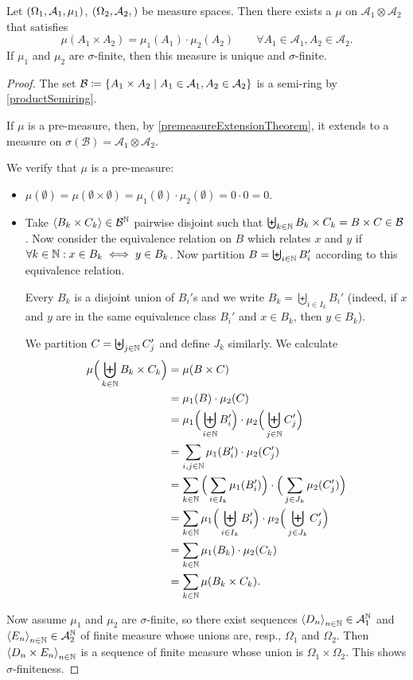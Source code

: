 \begin{proposition} \label{productMeasure}
Let $\sSet{\Omega_1, \mathcal{A}_1,\mu_1}$, $\sSet{\Omega_2, \mathcal{A}_2, }$ be measure spaces. Then there exists a $\mu$ on $\mathcal{A}_1\otimes\mathcal{A}_2$ that satisfies
\[ \mu(A_1\times A_2) = \mu_1(A_1)\cdot\mu_2(A_2) \qquad \forall A_1\in\mathcal{A}_1, A_2\in\mathcal{A}_2. \]
If $\mu_1$ and $\mu_2$ are $\sigma$-finite, then this measure is unique and $\sigma$-finite.
\end{proposition}
\begin{proof}
The set $\mathcal{B} \defeq \setbuilder{A_1\times A_2}{A_1\in \mathcal{A}_1, A_2\in \mathcal{A}_2}$ is a semi-ring by \ref{productSemiring}. 

If $\mu$ is a pre-measure, then, by \ref{premeasureExtensionTheorem}, it extends to a measure on $\sigma(\mathcal{B}) = \mathcal{A}_1\otimes\mathcal{A}_2$.

We verify that $\mu$ is a pre-measure:
\begin{itemize}
\item $\mu(\emptyset) = \mu(\emptyset \times\emptyset) = \mu_1(\emptyset)\cdot \mu_2(\emptyset) = 0\cdot 0 = 0$.
\item Take $\left\langle B_k\times C_k \right\rangle \in \mathcal{B}^{\mathbb{N}}$ pairwise disjoint such that $\biguplus_{k\in\mathbb{N}}B_k\times C_k = B\times C\in \mathcal{B}$. Now consider the equivalence relation on $B$ which relates $x$ and $y$ if $\forall k\in\mathbb{N}: x\in B_k \iff y\in B_k$. Now partition $B = \biguplus_{i\in\mathbb{N}} B'_{i}$ according to this equivalence relation. 

Every $B_k$ is a disjoint union of $B_i'$s and we write $B_k = \biguplus_{i\in I_k}B_i'$ (indeed, if $x$ and $y$ are in the same equivalence class $B_i'$ and $x\in B_k$, then $y\in B_k$). 

We partition $C = \biguplus_{j\in\mathbb{N}}C'_j$ and define $J_k$ similarly. We calculate
\begin{align*}
\mu\Big(\biguplus_{k\in\mathbb{N}} B_k\times C_k \Big) &= \mu(B\times C) \\
&= \mu_1(B)\cdot\mu_2(C) \\
&= \mu_1\Big(\biguplus_{i\in\mathbb{N}}B'_{i}\Big)\cdot\mu_2\Big(\biguplus_{j\in\mathbb{N}}C'_{j}\Big) \\
&= \sum_{i,j\in\mathbb{N}}\mu_1(B'_{i})\cdot\mu_2(C'_{j}) \\
&= \sum_{k\in\mathbb{N}} \Big(\sum_{i\in I_k}\mu_1(B'_{i})\Big)\cdot\Big(\sum_{j\in J_k}\mu_2(C'_{j})\Big) \\
&= \sum_{k\in\mathbb{N}} \mu_1\Big(\biguplus_{i\in I_k}B'_{i}\Big)\cdot\mu_2\Big(\biguplus_{j\in J_k}C'_{j}\Big) \\
&= \sum_{k\in\mathbb{N}} \mu_1(B_k)\cdot\mu_2(C_{k}) \\
&= \sum_{k\in\mathbb{N}} \mu(B_k\times C_{k}).
\end{align*}
\end{itemize}
Now assume $\mu_1$ and $\mu_2$ are $\sigma$-finite, so there exist sequences $\left\langle D_n \right\rangle_{n\in\mathbb{N}}\in \mathcal{A}_1^{\mathbb{N}}$ and $\left\langle E_n \right\rangle_{n\in\mathbb{N}}\in \mathcal{A}_2^{\mathbb{N}}$ of finite measure whose unions are, resp., $\Omega_1$ and $\Omega_2$. Then $\left\langle D_n\times E_n \right\rangle_{n\in \mathbb{N}}$ is a sequence of finite measure whose union is $\Omega_1\times\Omega_2$. This shows $\sigma$-finiteness.


\end{proof}
